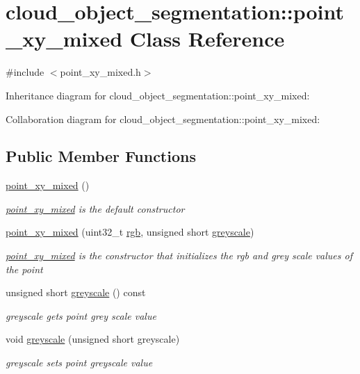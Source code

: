 \hypertarget{classcloud__object__segmentation_1_1point__xy__mixed}{}\section{cloud\+\_\+object\+\_\+segmentation\+:\+:point\+\_\+xy\+\_\+mixed Class Reference}
\label{classcloud__object__segmentation_1_1point__xy__mixed}


{\ttfamily \#include $<$point\+\_\+xy\+\_\+mixed.\+h$>$}



Inheritance diagram for cloud\+\_\+object\+\_\+segmentation\+:\+:point\+\_\+xy\+\_\+mixed\+:


Collaboration diagram for cloud\+\_\+object\+\_\+segmentation\+:\+:point\+\_\+xy\+\_\+mixed\+:
\subsection*{Public Member Functions}
\begin{DoxyCompactItemize}
\item 
\hyperlink{classcloud__object__segmentation_1_1point__xy__mixed_a6731b72d7ccd196d97ef60be1dab34c4}{point\+\_\+xy\+\_\+mixed} ()
\begin{DoxyCompactList}\small\item\em \hyperlink{classcloud__object__segmentation_1_1point__xy__mixed}{point\+\_\+xy\+\_\+mixed} is the default constructor \end{DoxyCompactList}\item 
\hyperlink{classcloud__object__segmentation_1_1point__xy__mixed_a3e84e2d296a2ce449ca273559891de99}{point\+\_\+xy\+\_\+mixed} (uint32\+\_\+t \hyperlink{classcloud__object__segmentation_1_1point__xy__rgb_a2839d12266dfc06ad01c4dbf7610fb93}{rgb}, unsigned short \hyperlink{classcloud__object__segmentation_1_1point__xy__mixed_a4739d702eb27bffcefb0d2809122b58a}{greyscale})
\begin{DoxyCompactList}\small\item\em \hyperlink{classcloud__object__segmentation_1_1point__xy__mixed}{point\+\_\+xy\+\_\+mixed} is the constructor that initializes the rgb and grey scale values of the point \end{DoxyCompactList}\item 
unsigned short \hyperlink{classcloud__object__segmentation_1_1point__xy__mixed_a4739d702eb27bffcefb0d2809122b58a}{greyscale} () const 
\begin{DoxyCompactList}\small\item\em greyscale gets point grey scale value \end{DoxyCompactList}\item 
void \hyperlink{classcloud__object__segmentation_1_1point__xy__mixed_a2bbd992f05f06187f015b4d74df6eb50}{greyscale} (unsigned short greyscale)
\begin{DoxyCompactList}\small\item\em greyscale sets point greyscale value \end{DoxyCompactList}\end{DoxyCompactItemize}


